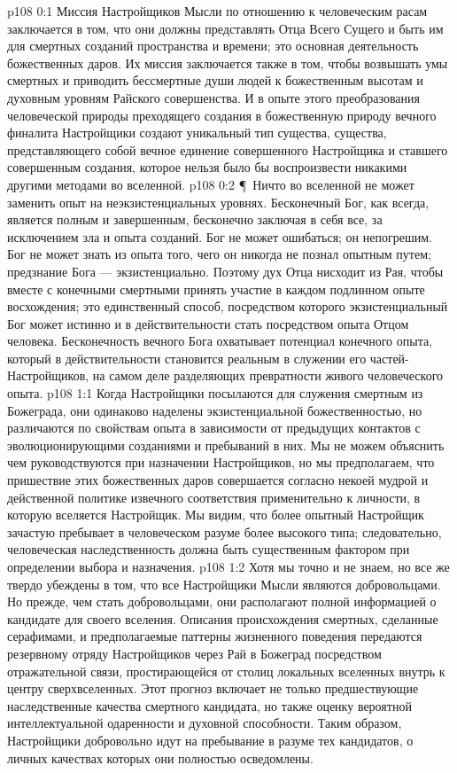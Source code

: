 \author{Одиночный Вестник}
\vs p108 0:1 Миссия Настройщиков Мысли по отношению к человеческим расам заключается в том, что они должны представлять Отца Всего Сущего и быть им для смертных созданий пространства и времени; это основная деятельность божественных даров. Их миссия заключается также в том, чтобы возвышать умы смертных и приводить бессмертные души людей к божественным высотам и духовным уровням Райского совершенства. И в опыте этого преобразования человеческой природы преходящего создания в божественную природу вечного финалита Настройщики создают уникальный тип существа, существа, представляющего собой вечное единение совершенного Настройщика и ставшего совершенным создания, которое нельзя было бы воспроизвести никакими другими методами во вселенной.
\vs p108 0:2 \P\ Ничто во вселенной не может заменить опыт на неэкзистенциальных уровнях. Бесконечный Бог, как всегда, является полным и завершенным, бесконечно заключая в себя все, за исключением зла и опыта созданий. Бог не может ошибаться; он непогрешим. Бог не может знать из опыта того, чего он никогда не познал опытным путем; предзнание Бога --- экзистенциально. Поэтому дух Отца нисходит из Рая, чтобы вместе с конечными смертными принять участие в каждом подлинном опыте восхождения; это единственный способ, посредством которого экзистенциальный Бог может истинно и в действительности стать посредством опыта Отцом человека. Бесконечность вечного Бога охватывает потенциал конечного опыта, который в действительности становится реальным в служении его частей\hyp{}Настройщиков, на самом деле разделяющих превратности живого человеческого опыта.
\vs p108 1:1 Когда Настройщики посылаются для служения смертным из Божеграда, они одинаково наделены экзистенциальной божественностью, но различаются по свойствам опыта в зависимости от предыдущих контактов с эволюционирующими созданиями и пребываний в них. Мы не можем объяснить чем руководствуются при назначении Настройщиков, но мы предполагаем, что пришествие этих божественных даров совершается согласно некоей мудрой и действенной политике извечного соответствия применительно к личности, в которую вселяется Настройщик. Мы видим, что более опытный Настройщик зачастую пребывает в человеческом разуме более высокого типа; следовательно, человеческая наследственность должна быть существенным фактором при определении выбора и назначения.
\vs p108 1:2 Хотя мы точно и не знаем, но все же твердо убеждены в том, что все Настройщики Мысли являются добровольцами. Но прежде, чем стать добровольцами, они располагают полной информацией о кандидате для своего вселения. Описания происхождения смертных, сделанные серафимами, и предполагаемые паттерны жизненного поведения передаются резервному отряду Настройщиков через Рай в Божеград посредством отражательной связи, простирающейся от столиц локальных вселенных внутрь к центру сверхвселенных. Этот прогноз включает не только предшествующие наследственные качества смертного кандидата, но также оценку вероятной интеллектуальной одаренности и духовной способности. Таким образом, Настройщики добровольно идут на пребывание в разуме тех кандидатов, о личных качествах которых они полностью осведомлены.
